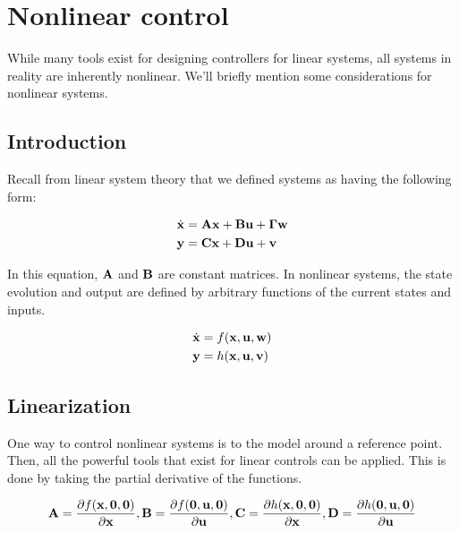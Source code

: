 \chapter{Nonlinear control} \label{ch:nonlinear-control}

While many tools exist for designing controllers for linear systems, all systems
in reality are inherently nonlinear. We'll briefly mention some considerations
for nonlinear systems.

\section{Introduction}

Recall from linear system theory that we defined systems as having the following
form:

\begin{align*}
  \dot{\mathbf{x}} &= \mathbf{A}\mathbf{x} + \mathbf{B}\mathbf{u} + \mathbf{\Gamma}\mathbf{w} \\
  \mathbf{y} &= \mathbf{C}\mathbf{x} + \mathbf{D}\mathbf{u} + \mathbf{v}
\end{align*}

In this equation, $\mathbf{A}$ and $\mathbf{B}$ are constant matrices. In nonlinear
systems, the state evolution and output are defined by arbitrary functions of
the current states and inputs.

\begin{align*}
  \dot{\mathbf{x}} &= f(\mathbf{x}, \mathbf{u}, \mathbf{w}) \\
  \mathbf{y} &= h(\mathbf{x}, \mathbf{u}, \mathbf{v})
\end{align*}

\section{Linearization}

One way to control nonlinear systems is to 
the model around a reference point. Then, all the powerful tools that exist for
linear controls can be applied. This is done by taking the partial derivative of
the functions.

\begin{align*}
  \mathbf{A} = \frac{\partial f(\mathbf{x}, \mathbf{0}, \mathbf{0})}{\partial \mathbf{x}},
  \mathbf{B} = \frac{\partial f(\mathbf{0}, \mathbf{u}, \mathbf{0})}{\partial \mathbf{u}},
  \mathbf{C} = \frac{\partial h(\mathbf{x}, \mathbf{0}, \mathbf{0})}{\partial \mathbf{x}},
  \mathbf{D} = \frac{\partial h(\mathbf{0}, \mathbf{u}, \mathbf{0})}{\partial \mathbf{u}}
\end{align*}

